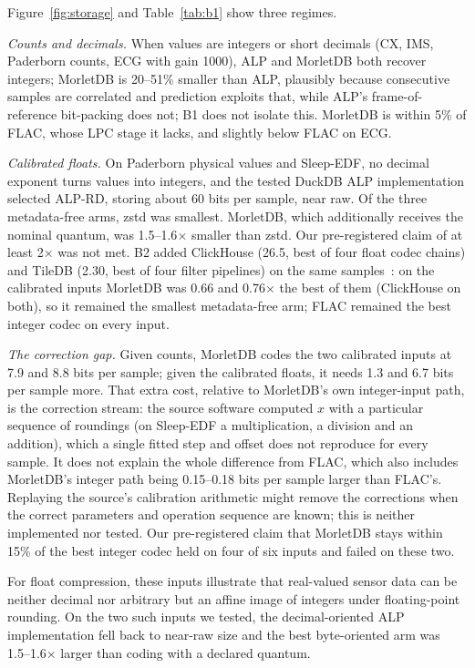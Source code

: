 \documentclass[sigconf,nonacm]{acmart}
\newcommand{\M}{MorletDB}
\begin{document}
Figure~\ref{fig:storage} and Table~\ref{tab:b1} show three regimes.

\emph{Counts and decimals.} When values are integers or short decimals (CX, IMS, Paderborn counts, ECG with gain 1000), ALP and \M{} both recover integers; \M{} is 20--51\% smaller than ALP, plausibly because consecutive samples are correlated and prediction exploits that, while ALP's frame-of-reference bit-packing does not; B1 does not isolate this. \M{} is within 5\% of FLAC, whose LPC stage it lacks, and slightly below FLAC on ECG.

\emph{Calibrated floats.} On Paderborn physical values and Sleep-EDF, no decimal exponent turns values into integers, and the tested DuckDB ALP implementation selected ALP-RD, storing about 60 bits per sample, near raw. Of the three metadata-free arms, zstd was smallest. \M{}, which additionally receives the nominal quantum, was 1.5--1.6$\times$ smaller than zstd. Our pre-registered claim of at least 2$\times$ was not met. B2 added ClickHouse (26.5, best of four float codec chains) and TileDB (2.30, best of four filter pipelines) on the same samples~\cite{b2}: on the calibrated inputs \M{} was 0.66 and 0.76$\times$ the best of them (ClickHouse  on both), so it remained the smallest metadata-free arm; FLAC remained the best integer codec on every input.

\emph{The correction gap.} Given counts, \M{} codes the two calibrated inputs at 7.9 and 8.8 bits per sample; given the calibrated floats, it needs 1.3 and 6.7 bits per sample more. That extra cost, relative to \M{}'s own integer-input path, is the correction stream: the source software computed $x$ with a particular sequence of roundings (on Sleep-EDF a multiplication, a division and an addition), which a single fitted step and offset does not reproduce for every sample. It does not explain the whole difference from FLAC, which also includes \M{}'s integer path being 0.15--0.18 bits per sample larger than FLAC's. Replaying the source's calibration arithmetic might remove the corrections when the correct parameters and operation sequence are known; this is neither implemented nor tested. Our pre-registered claim that \M{} stays within 15\% of the best integer codec held on four of six inputs and failed on these two.

For float compression, these inputs illustrate that real-valued sensor data can be neither decimal nor arbitrary but an affine image of integers under floating-point rounding. On the two such inputs we tested, the decimal-oriented ALP implementation fell back to near-raw size and the best byte-oriented arm was 1.5--1.6$\times$ larger than coding with a declared quantum.
\end{document}
